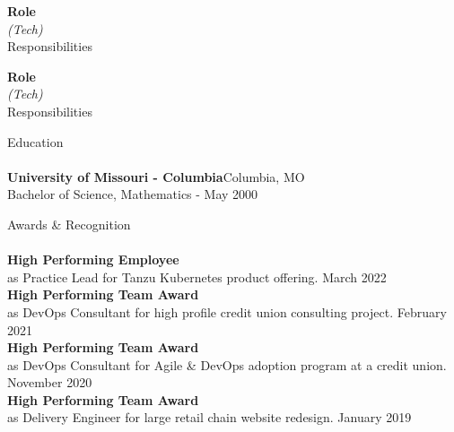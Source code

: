 \documentclass[letterpaper]{article}
\newcommand{\lineunder} {
    \vspace*{-8pt} \\
    \hspace*{-18pt} \hrulefill \\
}
\newcommand{\header} [1] {
    {\hspace*{-18pt}\vspace*{6pt} #1}
    \vspace*{-6pt} \lineunder
}
\begin{document}
{\textbf{Role}} \nopagebreak \\
{\sl (Tech)} \nopagebreak \\
Responsibilities\\
\vspace*{2mm}

{\textbf{Role}} \nopagebreak \\
{\sl (Tech)} \nopagebreak \\
Responsibilities\\
\vspace*{2mm}

\header{Education}
\textbf{University of Missouri - Columbia}\hfill Columbia, MO\\
Bachelor of Science, Mathematics \hfill  - May 2000\\
\vspace{2mm}

\header{Awards \& Recognition}
\textbf{High Performing Employee}\\
as Practice Lead for Tanzu Kubernetes product offering. \hfill March 2022\\
\vspace*{2mm}
\textbf{High Performing Team Award}\\
as DevOps Consultant for high profile credit union consulting project. \hfill February 2021\\
\vspace*{2mm}
\textbf{High Performing Team Award}\\
as DevOps Consultant for Agile \& DevOps adoption program at a credit union. \hfill November 2020\\
\vspace*{2mm}
\textbf{High Performing Team Award}\\
as Delivery Engineer for large retail chain website redesign. \hfill January 2019\\
\vspace*{2mm}

\ 
\end{document}
